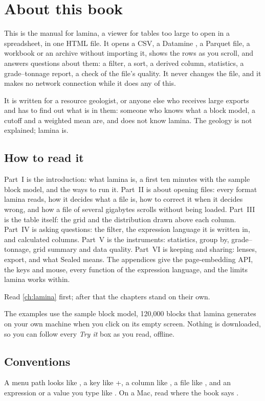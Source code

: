 \chapter*{About this book}

This is the manual for lamina, a viewer for tables too large to open in a spreadsheet, in one HTML file.
It opens a CSV, a Datamine , a Parquet file, a workbook or an archive without importing it,
shows the rows as you scroll, and answers questions about them: a filter, a sort, a derived column,
statistics, a grade–tonnage report, a check of the file's quality. It never changes the file, and it
makes no network connection while it does any of this.

It is written for a resource geologist, or anyone else who receives large exports and has to find out
what is in them: someone who knows what a block model, a cutoff and a weighted mean are, and does not
know lamina. The geology is not explained; lamina is.

\section*{How to read it}

Part~I is the introduction: what lamina is, a first ten minutes with the sample block model, and the
ways to run it. Part~II is about opening files: every format lamina reads, how it decides what a file
is, how to correct it when it decides wrong, and how a file of several gigabytes scrolls without being
loaded. Part~III is the table itself: the grid and the distribution drawn above each column. Part~IV is
asking questions: the filter, the expression language it is written in, and calculated columns. Part~V
is the instruments: statistics, group by, grade–tonnage, grid summary and data quality. Part~VI is
keeping and sharing: lenses, export, and what Sealed means. The appendices give the page-embedding API,
the keys and mouse, every function of the expression language, and the limits lamina works within.

Read \cref{ch:lamina} first; after that the chapters stand on their own.

The examples use the sample block model, 120{,}000 blocks that lamina generates on your own machine
when you click  on its empty screen. Nothing is downloaded, so you can
follow every \emph{Try it} box as you read, offline.

\section*{Conventions}

A menu path looks like , a key like +, a column like
, a file like , and an expression or a value you type like
. On a Mac, read  where the book says .

